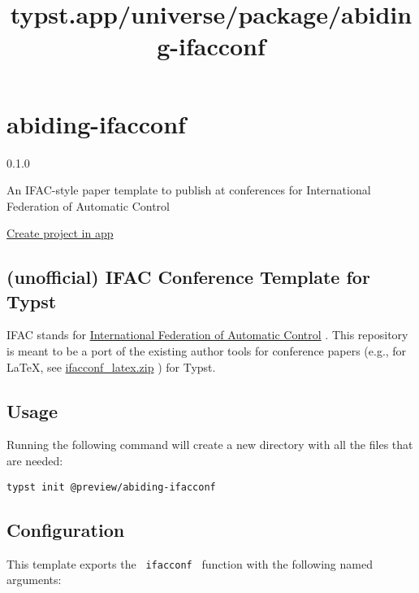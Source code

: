 \title{typst.app/universe/package/abiding-ifacconf}

\label{banner}
\label{template-thumbnail}

\section{abiding-ifacconf}\label{abiding-ifacconf}

{ 0.1.0 }

An IFAC-style paper template to publish at conferences for International
Federation of Automatic Control

\href{/app?template=abiding-ifacconf&version=0.1.0}{Create project in
app}

\label{readme}
\subsection{(unofficial) IFAC Conference Template for
Typst}\label{unofficial-ifac-conference-template-for-typst}

IFAC stands for \href{https://ifac-control.org/}{International
Federation of Automatic Control} . This repository is meant to be a port
of the existing author tools for conference papers (e.g., for LaTeX, see
\href{https://www.ifac-control.org/conferences/author-guide/copy_of_ifacconf_latex.zip/view}{ifacconf\_latex.zip}
) for Typst.

\subsection{Usage}\label{usage}

Running the following command will create a new directory with all the
files that are needed:

\begin{verbatim}
typst init @preview/abiding-ifacconf
\end{verbatim}

\subsection{Configuration}\label{configuration}

This template exports the \texttt{\ ifacconf\ } function with the
following named arguments:

